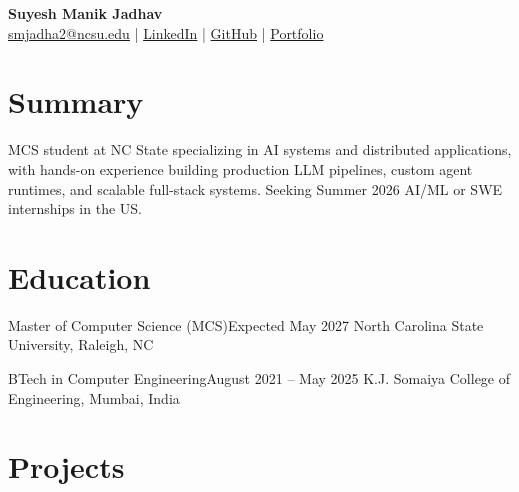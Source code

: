 \documentclass[letterpaper,10pt]{article}
\begin{document}
\begin{center}
  {\LARGE \textbf{Suyesh Manik Jadhav}} \\[2pt]
  \href{mailto:smjadha2@ncsu.edu}{smjadha2@ncsu.edu} \quad | \quad
  \href{https://linkedin.com/in/suyeshjadhav}{LinkedIn} \quad | \quad
  \href{https://github.com/SuyeshJadhav}{GitHub} \quad | \quad
  \href{https://suyeshjadhav.me}{Portfolio}
\end{center}

\section*{Summary}
MCS student at NC State specializing in AI systems and distributed applications, with hands-on experience building production LLM pipelines, custom agent runtimes, and scalable full-stack systems. Seeking Summer 2026 AI/ML or SWE internships in the US.


\section*{Education}
\resumeSubHeadingListStart
  \resumeSubheading
    {Master of Computer Science (MCS)}{Expected May 2027}
    {North Carolina State University, Raleigh, NC}{}
    \resumeItemListStart
    \resumeItemListEnd

  \resumeSubheading
    {BTech in Computer Engineering}{August 2021 -- May 2025}
    {K.J. Somaiya College of Engineering, Mumbai, India}{}
    \resumeItemListStart
    \resumeItemListEnd
\resumeSubHeadingListEnd

\section*{Projects}
\resumeSubHeadingListStart
\end{document}
